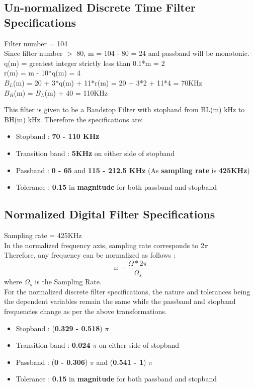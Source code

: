 \documentclass{article}
\begin{document}
\subsection{Un-normalized Discrete Time Filter Specifications}

Filter number = 104\\
Since filter number $>$ 80, m = 104 - 80 = 24 and passband will be monotonic.\\
q(m) = greatest integer strictly less than 0.1*m = 2\\
r(m) = m - 10*q(m) = 4\\
$B_L$(m) = 20 + 3*q(m) + 11*r(m) = 20 + 3*2 + 11*4 = 70KHz \\
$B_H$(m) = $B_L$(m) + 40 = 110KHz\\

\vspace{1.5em}
\noindent

This filter is given to be a Bandstop Filter with stopband from BL(m) kHz to BH(m) kHz.
Therefore the specifications are:
\begin{itemize}
    \item Stopband : \textbf{70 - 110 KHz}
    \item  Transition band : \textbf{5KHz} on either side of stopband
    \item Passband : \textbf{0 - 65} and \textbf{115 - 212.5 KHz} (As \textbf{sampling rate} is \textbf{425KHz})

    \item  Tolerance : \textbf{0.15} in \textbf{magnitude} for both passband and stopband
\end{itemize}


\subsection{Normalized Digital Filter Specifications}
Sampling rate = 425KHz\\
In the normalized frequency axis, sampling rate corresponds to 2$\pi$\\
Therefore, any frequency can be normalized as follows :
\begin{equation*}
    \omega = \frac{\Omega*2\pi}{\Omega_s}
\end{equation*}
where $\Omega_s$ is the Sampling Rate.\\

\vspace{1em}
\noindent
For the normalized discrete filter specifications, the nature and tolerances being the dependent variables remain the same while the passband and stopband frequencies change as per the above transformations. 
\begin{itemize}
    \item Stopband : (\textbf{0.329 -  0.518}) {$\pi$}
    \item  Transition band : \textbf{0.024} $\pi$ on either side of stopband
    \item Passband : (\textbf{0 - 0.306}) {$\pi$} and (\textbf{0.541 - 1}) {$\pi$}
    \item  Tolerance : \textbf{0.15} in \textbf{magnitude} for both passband and stopband
\end{itemize}
\end{document}
